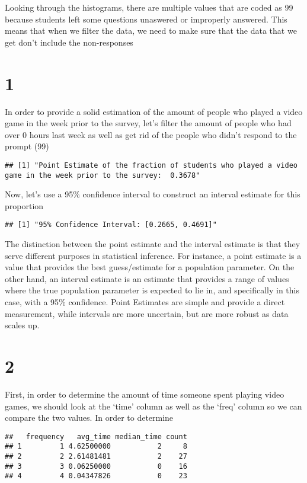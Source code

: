 \documentclass[
]{article}
\begin{document}
Looking through the histograms, there are multiple values that are coded
as 99 because students left some questions unaswered or improperly
answered. This means that when we filter the data, we need to make sure
that the data that we get don't include the non-responses

\section{1}\label{section}

In order to provide a solid estimation of the amount of people who
played a video game in the week prior to the survey, let's filter the
amount of people who had over 0 hours last week as well as get rid of
the people who didn't respond to the prompt (99)

\begin{verbatim}
## [1] "Point Estimate of the fraction of students who played a video game in the week prior to the survey:  0.3678"
\end{verbatim}

Now, let's use a 95\% confidence interval to construct an interval
estimate for this proportion

\begin{verbatim}
## [1] "95% Confidence Interval: [0.2665, 0.4691]"
\end{verbatim}

The distinction between the point estimate and the interval estimate is
that they serve different purposes in statistical inference. For
instance, a point estimate is a value that provides the best
guess/estimate for a population parameter. On the other hand, an
interval estimate is an estimate that provides a range of values where
the true population parameter is expected to lie in, and specifically in
this case, with a 95\% confidence. Point Estimates are simple and
provide a direct measurement, while intervals are more uncertain, but
are more robust as data scales up.

\section{2}\label{section-1}

First, in order to determine the amount of time someone spent playing
video games, we should look at the `time' column as well as the `freq'
column so we can compare the two values. In order to determine

\begin{verbatim}
##   frequency   avg_time median_time count
## 1         1 4.62500000           2     8
## 2         2 2.61481481           2    27
## 3         3 0.06250000           0    16
## 4         4 0.04347826           0    23
\end{verbatim}
\end{document}
